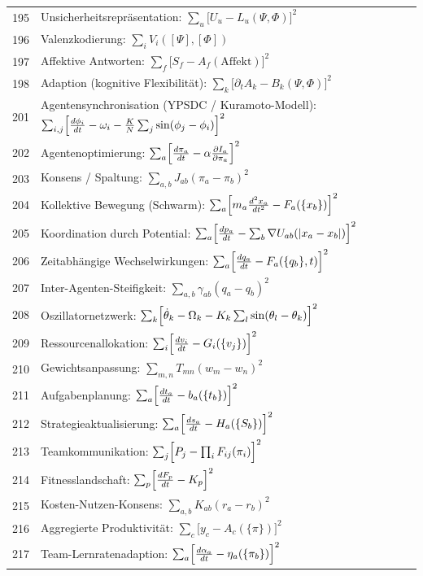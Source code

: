 \documentclass[11pt,a4paper]{article}
\begin{document}
\begin{longtable}{r l}
		195 & Unsicherheitsrepräsentation: $\sum_u\bigl[U_u - L_u(\Psi,\Phi)\bigr]^2$ \\
		196 & Valenzkodierung: $\sum_i V_i([\Psi],[\Phi])$ \\
		197 & Affektive Antworten: $\sum_f\bigl[S_f - A_f(\text{Affekt})\bigr]^2$ \\
		198 & Adaption (kognitive Flexibilität): $\sum_k\bigl[\partial_t A_k - B_k(\Psi,\Phi)\bigr]^2$ \\
		201 & Agentensynchronisation (YPSDC / Kuramoto-Modell): $\sum_{i,j}\Bigl[\frac{d\phi_i}{dt} - \omega_i - \frac{K}{N}\sum_j\sin(\phi_j-\phi_i)\Bigr]^2$ \\
		202 & Agentenoptimierung: $\sum_a\Bigl[\frac{d\pi_a}{dt} - \alpha\frac{\partial I_a}{\partial\pi_a}\Bigr]^2$ \\
		203 & Konsens / Spaltung: $\sum_{a,b}J_{ab}(\pi_a - \pi_b)^2$ \\
		204 & Kollektive Bewegung (Schwarm): $\sum_a\Bigl[m_a\frac{d^2 x_a}{dt^2} - F_a(\{x_b\})\Bigr]^2$ \\
		205 & Koordination durch Potential: $\sum_a\Bigl[\frac{dp_a}{dt} - \sum_b\nabla U_{ab}(|x_a-x_b|)\Bigr]^2$ \\
		206 & Zeitabhängige Wechselwirkungen: $\sum_a\Bigl[\frac{dq_a}{dt} - F_a(\{q_b\},t)\Bigr]^2$ \\
		207 & Inter-Agenten-Steifigkeit: $\sum_{a,b}\gamma_{ab}(q_a - q_b)^2$ \\
		208 & Oszillatornetzwerk: $\sum_k\Bigl[\dot\theta_k - \Omega_k - K_k\sum_l\sin(\theta_l-\theta_k)\Bigr]^2$ \\
		209 & Ressourcenallokation: $\sum_i\Bigl[\frac{dv_i}{dt} - G_i(\{v_j\})\Bigr]^2$ \\
		210 & Gewichtsanpassung: $\sum_{m,n}T_{mn}(w_m - w_n)^2$ \\
		211 & Aufgabenplanung: $\sum_a\Bigl[\frac{dt_a}{dt} - b_a(\{t_b\})\Bigr]^2$ \\
		212 & Strategieaktualisierung: $\sum_a\Bigl[\frac{ds_a}{dt} - H_a(\{S_b\})\Bigr]^2$ \\
		213 & Teamkommunikation: $\sum_j\Bigl[P_j - \prod_i F_{ij}(\pi_i)\Bigr]^2$ \\
		214 & Fitnesslandschaft: $\sum_p\Bigl[\frac{dF_p}{dt} - K_p\Bigr]^2$ \\
		215 & Kosten-Nutzen-Konsens: $\sum_{a,b}K_{ab}(r_a - r_b)^2$ \\
		216 & Aggregierte Produktivität: $\sum_c\bigl[y_c - A_c(\{\pi\})\bigr]^2$ \\
		217 & Team-Lernratenadaption: $\sum_a\Bigl[\frac{d\alpha_a}{dt} - \eta_a(\{\pi_b\})\Bigr]^2$ \\

\end{longtable}
\end{document}
